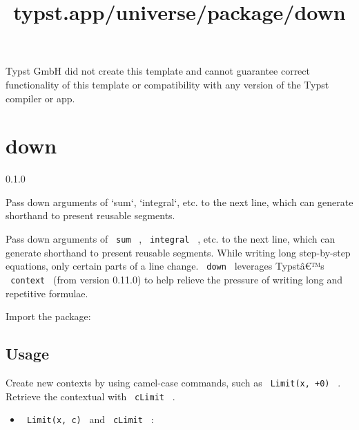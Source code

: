 Typst GmbH did not create this template and cannot guarantee correct
functionality of this template or compatibility with any version of the
Typst compiler or app.


\title{typst.app/universe/package/down}

\label{banner}
\section{down}\label{down}

{ 0.1.0 }

Pass down arguments of `sum`, `integral`, etc. to the next line, which
can generate shorthand to present reusable segments.

\label{readme}
Pass down arguments of \texttt{\ sum\ } , \texttt{\ integral\ } , etc.
to the next line, which can generate shorthand to present reusable
segments. While writing long step-by-step equations, only certain parts
of a line change. \texttt{\ down\ } leverages Typstâ€™s
\texttt{\ context\ } (from version 0.11.0) to help relieve the pressure
of writing long and repetitive formulae.

Import the package:

\begin{Shaded}
\begin{Highlighting}[]
\end{Highlighting}
\end{Shaded}

\subsection{Usage}\label{usage}

Create new contexts by using camel-case commands, such as
\texttt{\ Limit(x,\ +0)\ } . Retrieve the contextual with
\texttt{\ cLimit\ } .

\begin{itemize}
\tightlist
\item
  \texttt{\ Limit(x,\ c)\ } and \texttt{\ cLimit\ } :
\end{itemize}

\begin{Shaded}
\begin{Highlighting}[]
\NormalTok{$}
\NormalTok{$}
\end{Highlighting}
\end{Shaded}

